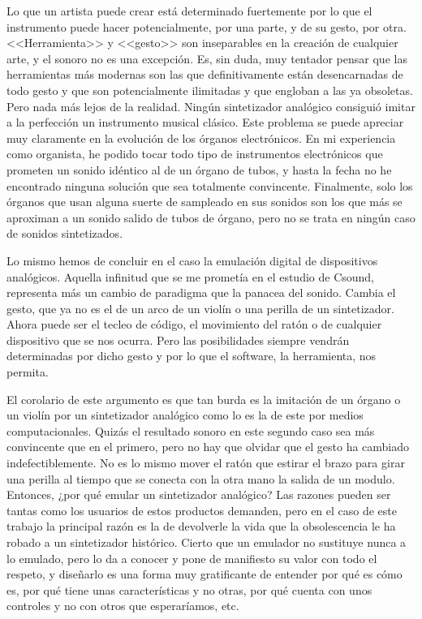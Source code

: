 Lo que un artista puede crear está determinado fuertemente por lo que el instrumento puede hacer potencialmente, por una parte, y de su gesto, por  otra. <<Herramienta>> y <<gesto>> son inseparables en la creación de cualquier arte, y el sonoro no es una excepción. Es, sin duda, muy tentador pensar que las herramientas más modernas son las que definitivamente están desencarnadas de todo gesto y que son potencialmente ilimitadas y que engloban a las ya obsoletas. Pero nada más lejos de la realidad. Ningún sintetizador analógico consiguió imitar a la perfección un instrumento musical clásico. Este problema se puede apreciar muy claramente en la evolución de los órganos electrónicos. En mi experiencia como organista, he podido tocar todo tipo de instrumentos electrónicos que prometen un sonido idéntico al de un órgano de tubos, y hasta la fecha no he encontrado ninguna solución que sea totalmente convincente. Finalmente, solo los órganos que usan alguna suerte de sampleado en sus sonidos son los que más se aproximan a un sonido salido de tubos de órgano, pero no se trata en ningún caso de sonidos sintetizados.

Lo mismo hemos de concluir en el caso la emulación digital de dispositivos analógicos. Aquella infinitud que se me prometía en el estudio de Csound, representa más un cambio de paradigma que la panacea del sonido. Cambia el gesto, que ya no es el de un arco de un violín o una perilla de un sintetizador. Ahora puede ser el tecleo de código, el movimiento del ratón o de cualquier dispositivo que se nos ocurra. Pero las posibilidades siempre vendrán determinadas por dicho gesto y por lo que el software, la herramienta, nos permita.

El corolario de este argumento es que tan burda es la imitación de un órgano o un violín por un sintetizador analógico como lo es la de este por medios computacionales. Quizás el resultado sonoro en este segundo caso sea más convincente que en el primero, pero no hay que olvidar que el gesto ha cambiado indefectiblemente. No es lo mismo mover el ratón que estirar el brazo para girar una perilla al tiempo que se conecta con la otra mano la salida de un modulo. Entonces, ¿por qué emular un sintetizador analógico? Las razones pueden ser tantas como los usuarios de estos productos demanden, pero en el caso de este trabajo la principal razón es la de devolverle la vida que la obsolescencia le ha robado a un sintetizador histórico. Cierto que un emulador no sustituye nunca a lo emulado, pero lo da a conocer y pone de manifiesto su valor con todo el respeto, y diseñarlo es una forma muy gratificante de entender por qué es cómo es, por qué tiene unas características y no otras, por qué cuenta con unos controles y no con otros que esperaríamos, etc. 

